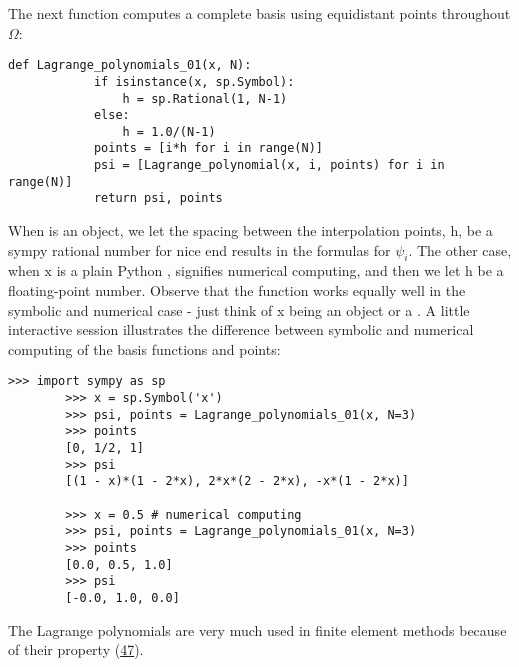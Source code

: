 \documentclass[../main.tex]{subfiles}
\begin{document}
	The next function computes a complete basis using equidistant points throughout
	$\Omega$:
	\begin{lstlisting}[numbers=none]
		def Lagrange_polynomials_01(x, N):
			if isinstance(x, sp.Symbol):
				h = sp.Rational(1, N-1)
			else:
				h = 1.0/(N-1)
			points = [i*h for i in range(N)]
			psi = [Lagrange_polynomial(x, i, points) for i in range(N)]
			return psi, points	
	\end{lstlisting}
	When  is an  object, we let the spacing between the interpolation points, $\mathrm{h}$, be a sympy rational number for nice end results in the formulas for $\psi_{i}$. The other case, when $\mathrm{x}$ is a plain Python , signifies numerical computing, and then we let $\mathrm{h}$ be a floating-point number. Observe that the  function works equally well in the symbolic and numerical case - just think of x being an  object or a . A little
	interactive session illustrates the difference between symbolic and numerical
	computing of the basis functions and points:
	\begin{lstlisting}[numbers=none]
		>>> import sympy as sp
		>>> x = sp.Symbol('x')
		>>> psi, points = Lagrange_polynomials_01(x, N=3)
		>>> points
		[0, 1/2, 1]
		>>> psi
		[(1 - x)*(1 - 2*x), 2*x*(2 - 2*x), -x*(1 - 2*x)]
		
		>>> x = 0.5 # numerical computing
		>>> psi, points = Lagrange_polynomials_01(x, N=3)
		>>> points
		[0.0, 0.5, 1.0]
		>>> psi
		[-0.0, 1.0, 0.0]	
	\end{lstlisting}
	The Lagrange polynomials are very much used in finite element methods because
	of their property (\hyperref[eqa47]{47}).
	
\end{document}
